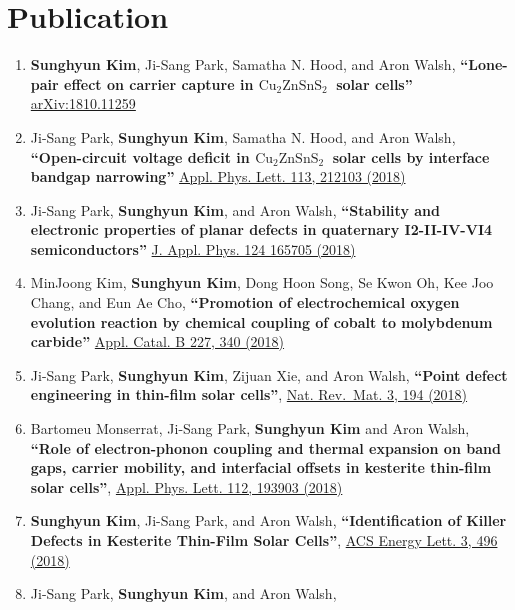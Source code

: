 \section{Publication}\label{publication}

\begin{enumerate}
\def\labelenumi{\arabic{enumi}.}
\item
  \textbf{Sunghyun Kim}, Ji-Sang Park, Samatha N. Hood, and Aron Walsh,
  \textbf{``Lone-pair effect on carrier capture in
  \(\mathrm{Cu_2ZnSnS_2}~\) solar cells''}
  \href{https://arxiv.org/abs/1810.11259}{arXiv:1810.11259}
\item
  Ji-Sang Park, \textbf{Sunghyun Kim}, Samatha N. Hood, and Aron Walsh,
  \textbf{``Open-circuit voltage deficit in \(\mathrm{Cu_2ZnSnS_2}~\)
  solar cells by interface bandgap narrowing''}
  \href{https://aip.scitation.org/doi/abs/10.1063/1.5063793}{Appl. Phys.
  Lett. 113, 212103 (2018)}
\item
  Ji-Sang Park, \textbf{Sunghyun Kim}, and Aron Walsh,
  \textbf{``Stability and electronic properties of planar defects in
  quaternary I2-II-IV-VI4 semiconductors''}
  \href{https://doi.org/10.1063/1.5053424}{J. Appl. Phys. 124 165705
  (2018)}
\item
  MinJoong Kim, \textbf{Sunghyun Kim}, Dong Hoon Song, Se Kwon Oh, Kee
  Joo Chang, and Eun Ae Cho, \textbf{``Promotion of electrochemical
  oxygen evolution reaction by chemical coupling of cobalt to molybdenum
  carbide''} \href{https://doi.org/10.1016/j.apcatb.2018.01.051}{Appl.
  Catal. B 227, 340 (2018)}
\item
  Ji-Sang Park, \textbf{Sunghyun Kim}, Zijuan Xie, and Aron Walsh,
  \textbf{``Point defect engineering in thin-film solar cells''},
  \href{https://doi.org/10.1038/s41578-018-0026-7}{Nat. Rev.~Mat. 3, 194
  (2018)}
\item
  Bartomeu Monserrat, Ji-Sang Park, \textbf{Sunghyun Kim} and Aron
  Walsh, \textbf{``Role of electron-phonon coupling and thermal
  expansion on band gaps, carrier mobility, and interfacial offsets in
  kesterite thin-film solar cells''},
  \href{https://doi.org/10.1063/1.5028186}{Appl. Phys. Lett. 112, 193903
  (2018)}
\item
  \textbf{Sunghyun Kim}, Ji-Sang Park, and Aron Walsh,
  \textbf{``Identification of Killer Defects in Kesterite Thin-Film
  Solar Cells''},
  \href{https://pubs.acs.org/doi/abs/10.1021/acsenergylett.7b01313}{ACS
  Energy Lett. 3, 496 (2018)}
\item
  Ji-Sang Park, \textbf{Sunghyun Kim}, and Aron Walsh,

\end{enumerate}
